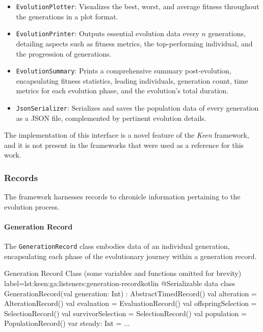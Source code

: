   \begin{itemize}
    \item \texttt{EvolutionPlotter}: Visualizes the best, worst, and average 
      fitness throughout the generations in a plot format.
    \item \texttt{EvolutionPrinter}: Outputs essential evolution data every 
      \(n\) generations, detailing aspects such as fitness metrics, the 
      top-performing individual, and the progression of generations.
    \item \texttt{EvolutionSummary}: Prints a comprehensive summary 
      post-evolution, encapsulating fitness statistics, leading individuals, 
      generation count, time metrics for each evolution phase, and the 
      evolution's total duration.
    \item \texttt{JsonSerializer}: Serializes and saves the population data of 
      every generation as a JSON file, complemented by pertinent evolution 
      details.
  \end{itemize}

  The implementation of this interface is a novel feature of the \textit{Keen}
  framework, and it is not present in the frameworks that were used as a
  reference for this work.

  \subsubsection{Records}
    The framework harnesses records to chronicle information pertaining to the 
    evolution process.

    \paragraph{Generation Record}
      The \texttt{GenerationRecord} class embodies data of an individual 
      generation, encapsulating each phase of the evolutionary journey within a 
      generation record.

      \begin{code}{
        Generation Record Class (some variables and functions omitted for 
        brevity)
      }{label=lst:keen:ga:listeners:generation-record}{kotlin}
        @Serializable
        data class GenerationRecord(val generation: Int) : AbstractTimedRecord() {
            val alteration = AlterationRecord()
            val evaluation = EvaluationRecord()
            val offspringSelection = SelectionRecord()
            val survivorSelection = SelectionRecord()
            val population = PopulationRecord()
            var steady: Int = ...
        }
      \end{code}
      
